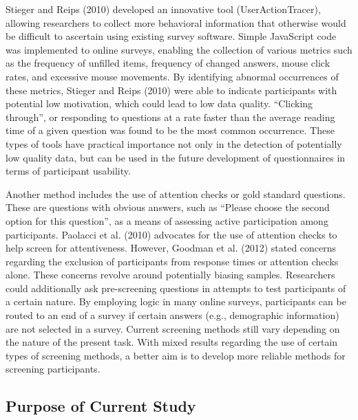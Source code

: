\documentclass[english,man]{apa6}
\theoremstyle{definition}
\theoremstyle{definition}
\theoremstyle{definition}
\theoremstyle{remark}
\begin{document}
Stieger and Reips (2010) developed an innovative tool
(UserActionTracer), allowing researchers to collect more behavioral
information that otherwise would be difficult to ascertain using
existing survey software. Simple JavaScript code was implemented to
online surveys, enabling the collection of various metrics such as the
frequency of unfilled items, frequency of changed answers, mouse click
rates, and excessive mouse movements. By identifying abnormal
occurrences of these metrics, Stieger and Reips (2010) were able to
indicate participants with potential low motivation, which could lead to
low data quality. \enquote{Clicking through}, or responding to questions
at a rate faster than the average reading time of a given question was
found to be the most common occurrence. These types of tools have
practical importance not only in the detection of potentially low
quality data, but can be used in the future development of
questionnaires in terms of participant usability.

Another method includes the use of attention checks or gold standard
questions. These are questions with obvious answers, such as
\enquote{Please choose the second option for this question}, as a means
of assessing active participation among participants. Paolacci et al.
(2010) advocates for the use of attention checks to help screen for
attentiveness. However, Goodman et al. (2012) stated concerns regarding
the exclusion of participants from response times or attention checks
alone. These concerns revolve around potentially biasing samples.
Researchers could additionally ask pre-screening questions in attempts
to test participants of a certain nature. By employing logic in many
online surveys, participants can be routed to an end of a survey if
certain answers (e.g., demographic information) are not selected in a
survey. Current screening methods still vary depending on the nature of
the present task. With mixed results regarding the use of certain types
of screening methods, a better aim is to develop more reliable methods
for screening participants.

\subsection{Purpose of Current Study}\label{purpose-of-current-study}
\end{document}
